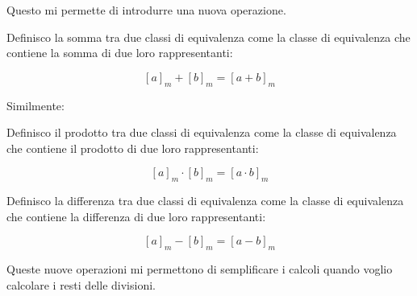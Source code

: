 Questo mi permette di introdurre una nuova operazione.

\begin{mdframed}
    \begin{definizione}
        Definisco la somma tra due classi di equivalenza come la classe di equivalenza che contiene la somma di due loro rappresentanti:

        \begin{equation}
            \label{eq:somma} [a]_m + [b]_m = [a + b]_m
        \end{equation}
    \end{definizione}
\end{mdframed}

Similmente:

\begin{mdframed}
    \begin{definizione}
        Definisco il prodotto tra due classi di equivalenza come la classe di equivalenza che contiene il prodotto di due loro rappresentanti:

        \begin{equation}
            \label{eq:prodotto} [a]_m \cdot [b]_m = [a \cdot b]_m
        \end{equation}
    \end{definizione}
\end{mdframed}

\begin{mdframed}
    \begin{definizione}
        Definisco la differenza tra due classi di equivalenza come la classe di equivalenza che contiene la differenza di due loro rappresentanti:

        \begin{equation}
            \label{eq:differenza} [a]_m - [b]_m = [a - b]_m
        \end{equation}
    \end{definizione}
\end{mdframed}

Queste nuove operazioni mi permettono di semplificare i calcoli quando voglio calcolare i resti delle divisioni.

